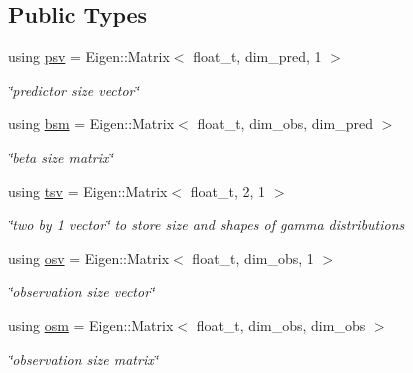 \subsection*{Public Types}
\begin{DoxyCompactItemize}
\item 
\mbox{\label{classmultivGamFilter_a396935d27512187b9109a70ba04c6abf}} 
using \hyperlink{classmultivGamFilter_a396935d27512187b9109a70ba04c6abf}{psv} = Eigen\+::\+Matrix$<$ float\+\_\+t, dim\+\_\+pred, 1 $>$
\begin{DoxyCompactList}\small\item\em \char`\"{}predictor size vector\char`\"{} \end{DoxyCompactList}\item 
\mbox{\label{classmultivGamFilter_a48015c1ef68e2d0a704306b56378417d}} 
using \hyperlink{classmultivGamFilter_a48015c1ef68e2d0a704306b56378417d}{bsm} = Eigen\+::\+Matrix$<$ float\+\_\+t, dim\+\_\+obs, dim\+\_\+pred $>$
\begin{DoxyCompactList}\small\item\em \char`\"{}beta size matrix\char`\"{} \end{DoxyCompactList}\item 
\mbox{\label{classmultivGamFilter_a312ca8e7f1344cdeb01fe9e01850aa8e}} 
using \hyperlink{classmultivGamFilter_a312ca8e7f1344cdeb01fe9e01850aa8e}{tsv} = Eigen\+::\+Matrix$<$ float\+\_\+t, 2, 1 $>$
\begin{DoxyCompactList}\small\item\em \char`\"{}two by 1 vector\char`\"{} to store size and shapes of gamma distributions \end{DoxyCompactList}\item 
\mbox{\label{classmultivGamFilter_a34e62f4c6f1de388b86e6106f249cef8}} 
using \hyperlink{classmultivGamFilter_a34e62f4c6f1de388b86e6106f249cef8}{osv} = Eigen\+::\+Matrix$<$ float\+\_\+t, dim\+\_\+obs, 1 $>$
\begin{DoxyCompactList}\small\item\em \char`\"{}observation size vector\char`\"{} \end{DoxyCompactList}\item 
\mbox{\label{classmultivGamFilter_af55e5c995ab517331ce05dd7ca4f1781}} 
using \hyperlink{classmultivGamFilter_af55e5c995ab517331ce05dd7ca4f1781}{osm} = Eigen\+::\+Matrix$<$ float\+\_\+t, dim\+\_\+obs, dim\+\_\+obs $>$
\begin{DoxyCompactList}\small\item\em \char`\"{}observation size matrix\char`\"{} \end{DoxyCompactList}\end{DoxyCompactItemize}
